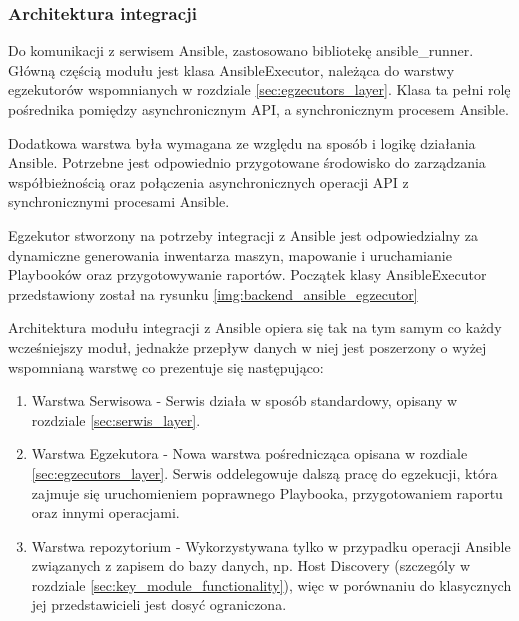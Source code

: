 \subsubsection{Architektura integracji}
\label{sec:ansible_integration}
\par
Do komunikacji z serwisem \gls{Ansible}, zastosowano bibliotekę ansible\_runner.
Główną częścią modułu jest klasa AnsibleExecutor, należąca do warstwy egzekutorów wspomnianych w rozdziale \ref{sec:egzecutors_layer}.
Klasa ta pełni rolę pośrednika pomiędzy asynchronicznym \gls{API}, a synchronicznym procesem \gls{Ansible}.
\par
Dodatkowa warstwa była wymagana ze względu na sposób i logikę działania \gls{Ansible}.
Potrzebne jest odpowiednio przygotowane środowisko do zarządzania współbieżnością oraz połączenia asynchronicznych operacji \gls{API} z synchronicznymi procesami \gls{Ansible}.
\par
Egzekutor stworzony na potrzeby integracji z \gls{Ansible} jest odpowiedzialny za dynamiczne generowania inwentarza maszyn, mapowanie i uruchamianie \gls{Playbook}ów oraz przygotowywanie raportów.
Początek klasy AnsibleExecutor przedstawiony został na rysunku \ref{img:backend_ansible_egzecutor}
\par
Architektura modułu integracji z \gls{Ansible} opiera się tak na tym samym co każdy wcześniejszy moduł, jednakże przepływ danych w niej jest poszerzony o wyżej wspomnianą warstwę co prezentuje się następująco:
\begin{enumerate}
    \item Warstwa Serwisowa - Serwis działa w sposób standardowy, opisany w rozdziale \ref{sec:serwis_layer}.
    \item Warstwa Egzekutora - Nowa warstwa pośrednicząca opisana w rozdiale \ref{sec:egzecutors_layer}. Serwis oddelegowuje dalszą pracę do egzekucji, która zajmuje się uruchomieniem poprawnego \gls{Playbook}a, przygotowaniem raportu oraz innymi operacjami.
    \item Warstwa repozytorium - Wykorzystywana tylko w przypadku operacji \gls{Ansible} związanych z zapisem do bazy danych, np. Host Discovery (szczególy w rozdziale \ref{sec:key_module_functionality}), więc w porównaniu do klasycznych jej przedstawicieli jest dosyć ograniczona.
\end{enumerate}
